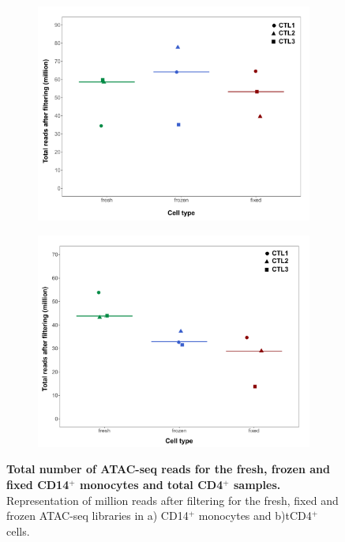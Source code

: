 \begin{figure}[htbp]
\centering
\begin{subfigure}{0.5\textwidth}
\centering
\includegraphics[width=\textwidth]{./Results1/pdfs/Core_ATAC_CD14_fresh_frozen_fixed_filtered_total_reads}
\caption{\textbf{}}
\end{subfigure}%
\begin{subfigure}{0.5\textwidth}
\centering
\includegraphics[width=\textwidth]{./Results1/pdfs/Core_ATAC_CD4_fresh_frozen_fixed_filtered_total_reads}
\caption{\textbf{}}
\end{subfigure}
\caption[Total number of ATAC-seq reads for the fresh, frozen and fixed CD14$^+$ monocytes and total CD4$^+$ samples.]{\textbf{Total number of ATAC-seq reads for the fresh, frozen and fixed CD14$^+$ monocytes and total CD4$^+$ samples.} Representation of million reads after filtering for the fresh, fixed and frozen ATAC-seq libraries in a) CD14$^+$ monocytes and b)tCD4$^+$ cells.}
\label{figure:Core_ATAC_all_conditions_total_reads}
\end{figure} 

